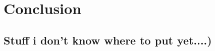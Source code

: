 
\chapter{Conclusion} %

\label{Chapter9} %


\section{Stuff i don't know where to put yet....)}




